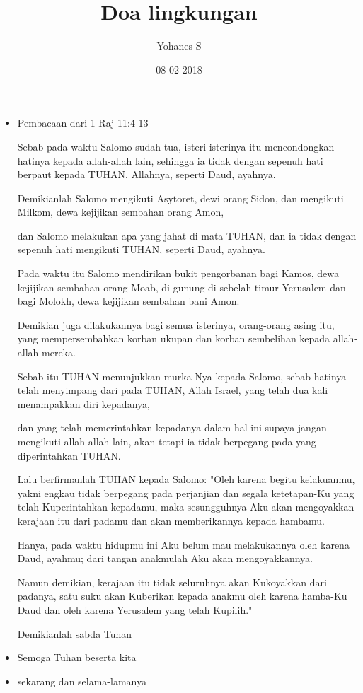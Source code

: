 \documentclass[a4paper,12pt]{article}
\title{Doa lingkungan}
\date{08-02-2018}
\author{Yohanes S}
\newcommand{\BU}[1]{\begin{itemize} \item[U:] #1 \end{itemize}}
\newcommand{\BP}[1]{\begin{itemize} \item[P:] #1 \end{itemize}}
\begin{document}
\maketitle
\onehalfspacing
\BP{Pembacaan dari 1 Raj 11:4-13
	
	Sebab pada waktu Salomo sudah tua, isteri-isterinya itu mencondongkan hatinya kepada allah-allah lain, sehingga ia tidak dengan sepenuh hati berpaut kepada TUHAN, Allahnya, seperti Daud, ayahnya.
	
	Demikianlah Salomo mengikuti Asytoret, dewi orang Sidon, dan mengikuti Milkom, dewa kejijikan sembahan orang Amon,
	
	dan Salomo melakukan apa yang jahat di mata TUHAN, dan ia tidak dengan sepenuh hati mengikuti TUHAN, seperti Daud, ayahnya.
	
	Pada waktu itu Salomo mendirikan bukit pengorbanan bagi Kamos, dewa kejijikan sembahan orang Moab, di gunung di sebelah timur Yerusalem dan bagi Molokh, dewa kejijikan sembahan bani Amon.
	
	Demikian juga dilakukannya bagi semua isterinya, orang-orang asing itu, yang mempersembahkan korban ukupan dan korban sembelihan kepada allah-allah mereka.
	
	Sebab itu TUHAN menunjukkan murka-Nya kepada Salomo, sebab hatinya telah menyimpang dari pada TUHAN, Allah Israel, yang telah dua kali menampakkan diri kepadanya,
	
	dan yang telah memerintahkan kepadanya dalam hal ini supaya jangan mengikuti allah-allah lain, akan tetapi ia tidak berpegang pada yang diperintahkan TUHAN.
	
	Lalu berfirmanlah TUHAN kepada Salomo: "Oleh karena begitu kelakuanmu, yakni engkau tidak berpegang pada perjanjian dan segala ketetapan-Ku yang telah Kuperintahkan kepadamu, maka sesungguhnya Aku akan mengoyakkan kerajaan itu dari padamu dan akan memberikannya kepada hambamu.
	
	Hanya, pada waktu hidupmu ini Aku belum mau melakukannya oleh karena Daud, ayahmu; dari tangan anakmulah Aku akan mengoyakkannya.
	
	Namun demikian, kerajaan itu tidak seluruhnya akan Kukoyakkan dari padanya, satu suku akan Kuberikan kepada anakmu oleh karena hamba-Ku Daud dan oleh karena Yerusalem yang telah Kupilih."
	
	Demikianlah sabda Tuhan
}

\BP{Semoga Tuhan beserta kita}

\BU{sekarang dan selama-lamanya}
\end{document}
